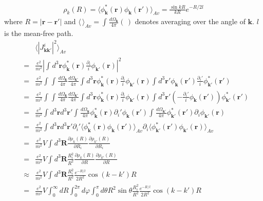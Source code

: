 \documentclass[aps,prb,reprint,noeprint,superscriptaddress]{revtex4-1}
\begin{document}
\begin{eqnarray*}
	\rho_k(R) = \langle \phi_\mathbf{k}^*(\mathbf{r})
	\phi_\mathbf{k}(\mathbf{r}') \rangle_{Av}
	=
	\frac{\sin k R}{k R} e^{-R/2l}
\end{eqnarray*}
where $R=\left|\mathbf{r}-\mathbf{r}'\right|$ and $\langle \, \rangle_{Av} =
\int_{}^{}\frac{d\Omega_\mathbf{k}}{4\pi}(\,)$ denotes
averaging over the angle of $\mathbf{k}$. $l$ is the mean-free path.
\begin{eqnarray*}
	&&\langle 
	\left|J^i_{\mathbf{k}\mathbf{k}'}\right|^2 
	\rangle_{Av}
	\\
	&=&
	\frac{e^2}{m^2} 
	\left|
	\int_{}^{} d^3\mathbf{r} \phi_\mathbf{k}^*(\mathbf{r})
	\frac{\partial_i}{i} \phi_{\mathbf{k}'}(\mathbf{r})
	\right|^2
	\\
	&=& \frac{e^2}{m^2} 
	\int_{}^{}\int_{}^{}\frac{d\Omega_\mathbf{k}}{4\pi}
	\frac{d\Omega_{\mathbf{k}'}}{4\pi}
		\int_{}^{} d^3\mathbf{r} \phi_\mathbf{k}^*(\mathbf{r})
		\frac{\partial_i}{i} \phi_{\mathbf{k}'}(\mathbf{r})
		\int_{}^{} d^3\mathbf{r}' \phi_\mathbf{k}(\mathbf{r}')
		 \frac{\partial_i'}{i} \phi_{\mathbf{k}'}^*(\mathbf{r'})
	\\
	&=& \frac{e^2}{m^2} 
	\int_{}^{}\int_{}^{}
	\frac{d\Omega_\mathbf{k}}{4\pi}
	\frac{d\Omega_{\mathbf{k}'}}{4\pi}
		\int_{}^{} d^3\mathbf{r} 
		\phi_\mathbf{k}^*(\mathbf{r})
		\frac{\partial_i}{i} \phi_{\mathbf{k}'}(\mathbf{r})
		\int_{}^{} d^3\mathbf{r}' 
		\left(-\frac{\partial_i'}{i}\phi_\mathbf{k}(\mathbf{r}')\right)
		\phi_{\mathbf{k}'}^*(\mathbf{r'})
	\\
	&=& \frac{e^2}{m^2} 
		\int_{}^{} d^3\mathbf{r} 
		d^3\mathbf{r}' 
	\int_{}^{}
	\frac{d\Omega_\mathbf{k}}{4\pi}
		\phi_\mathbf{k}^*(\mathbf{r})
		\partial_i'\phi_\mathbf{k}(\mathbf{r}')
	\int_{}^{}
	\frac{d\Omega_{\mathbf{k}'}}{4\pi}
		\phi_{\mathbf{k}'}^*(\mathbf{r'})
		\partial_i \phi_{\mathbf{k}'}(\mathbf{r})
	\\
	&=& \frac{e^2}{m^2} 
		\int_{}^{} d^3\mathbf{r} 
		d^3\mathbf{r}' 
		\partial_i'
		\langle 
		\phi_\mathbf{k}^*(\mathbf{r})
		\phi_\mathbf{k}(\mathbf{r}')
		\rangle_{Av}
		\partial_i 
		\langle 
		\phi_{\mathbf{k}'}^*(\mathbf{r'})
		\phi_{\mathbf{k}'}(\mathbf{r})
		\rangle_{Av}
	\\
	&=& \frac{e^2}{m^2} V
		\int_{}^{} d^3\mathbf{R} 
		\frac{\partial \rho_k(R)}{\partial R_i}
		\frac{\partial \rho_{k'}(R)}{\partial R_i}
	\\
	&=& \frac{e^2}{m^2} V
		\int_{}^{} d^3\mathbf{R} 
		\frac{R_i^2}{R^2}
		\frac{\partial \rho_k(R)}{\partial R}
		\frac{\partial \rho_{k'}(R)}{\partial R}
	\\
	&\approx& \frac{e^2}{m^2} V
		\int_{}^{} d^3\mathbf{R} 
		\frac{R_i^2}{R^2}
		\frac{e^{-R/l}}{2R^2} \cos (k-k')R
	\\
	&=& \frac{e^2}{m^2} V
		\int_{0}^{\infty}dR
		\int_{0}^{2\pi}d\varphi
		\int_{0}^{\pi}d\theta
		R^2 \sin \theta	
		\frac{R_i^2}{R^2}
		\frac{e^{-R/l}}{2R^2} \cos (k-k')R
\end{eqnarray*}
\end{document}
